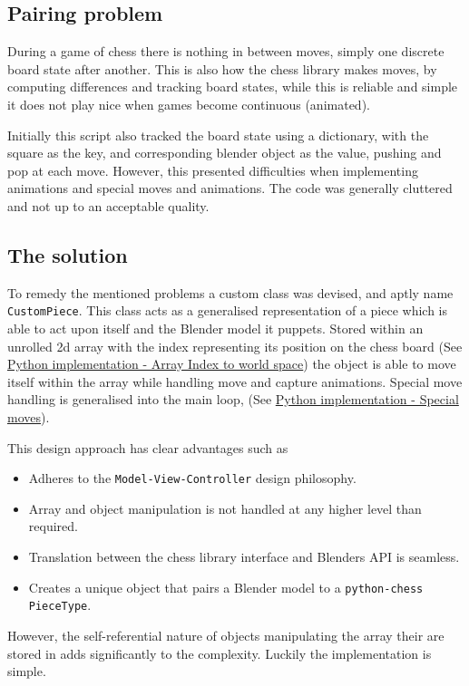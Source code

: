 \documentclass[11pt]{article}
\begin{document}
\subsection{Pairing problem}
\label{sec:org588d425}
During a game of chess there is nothing in between moves, simply one discrete
board state after another. This is also how the chess library makes moves, by
computing differences and tracking board states, while this is reliable and
simple it does not play nice when games become continuous (animated).

Initially this script also tracked the board state using a dictionary, with the
square as the key, and corresponding blender object as the value, pushing and
pop at each move. However, this presented difficulties when implementing
animations and special moves and animations. The code was generally cluttered
and not up to an acceptable quality.
\subsection{The solution}
\label{sec:orgca2ff9a}
To remedy the mentioned problems a custom class was devised, and aptly name
\texttt{CustomPiece}. This class acts as a generalised representation of a piece which
is able to act upon itself and the Blender model it puppets. Stored within an
unrolled 2d array with the index representing its position on the chess board
(See \hyperref[sec:orgd755ba3]{Python implementation - Array Index to world space}) the object is able to
move itself within the array while handling move and capture animations. Special
move handling is generalised into the main loop, (See \hyperref[sec:org0d3d549]{Python implementation -
Special moves}).

This design approach has clear advantages such as
\begin{itemize}
\item Adheres to the \texttt{Model-View-Controller} design philosophy.
\item Array and object manipulation is not handled at any higher level than required.
\item Translation between the chess library interface and Blenders API is seamless.
\item Creates a unique object that pairs a Blender model to a \texttt{python-chess}
\texttt{PieceType}.
\end{itemize}
However, the self-referential nature of objects manipulating the array their
are stored in adds significantly to the complexity. Luckily the implementation is
simple.
\end{document}
